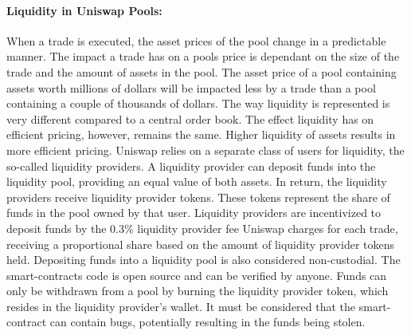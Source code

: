 \documentclass[../../thesis.tex]{subfiles}
\begin{document}
\paragraph{Liquidity in Uniswap Pools:}
When a trade is executed, the asset prices of the pool change in a predictable manner. The impact a trade has on a pools price is dependant on the size of the trade and the amount of assets in the pool. The asset price of a pool containing assets worth millions of dollars will be impacted less by a trade than a pool containing a couple of thousands of dollars. The way liquidity is represented is very different compared to a central order book. The effect liquidity has on efficient pricing, however, remains the same. Higher liquidity of assets results in more efficient pricing. 
Uniswap relies on a separate class of users for liquidity, the so-called liquidity providers. A liquidity provider can deposit funds into the liquidity pool, providing an equal value of both assets. In return, the liquidity providers receive liquidity provider tokens. These tokens represent the share of funds in the pool owned by that user. Liquidity providers are incentivized to deposit funds by the 0.3\% liquidity provider fee Uniswap charges for each trade, receiving a proportional share based on the amount of liquidity provider tokens held. Depositing funds into a liquidity pool is also considered non-custodial. The smart-contracts code is open source and can be verified by anyone. Funds can only be withdrawn from a pool by burning the liquidity provider token, which resides in the liquidity provider's wallet. It must be considered that the smart-contract can contain bugs, potentially resulting in the funds being stolen.
\end{document}
